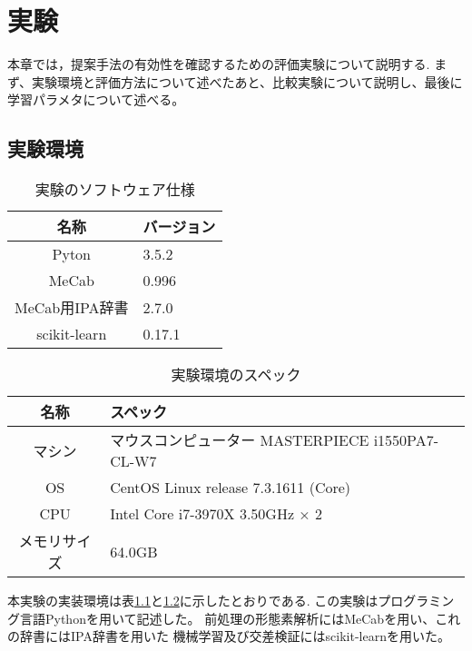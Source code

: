 \chapter{実験}
本章では，提案手法の有効性を確認するための評価実験について説明する.
まず、実験環境と評価方法について述べたあと、比較実験について説明し、最後に学習パラメタについて述べる。

\section{実験環境}
\begin{table}[ht]
  \begin{center}
  \caption{実験のソフトウェア仕様}
  \label{ex-software}
  \begin{tabular}{|c|l|}
    \hline
    名称 & バージョン \\ \hline \hline
    Pyton & 3.5.2 \\ \hline
    MeCab &  0.996 \\ \hline
    MeCab用IPA辞書 & 2.7.0 \\ \hline
    scikit-learn & 0.17.1 \\ \hline
  \end{tabular}
  \end{center}
\end{table}


\begin{table}[ht]
  \begin{center}
  \caption{実験環境のスペック}
  \label{ex-spec}
  \begin{tabular}{|c|l|}
    \hline
     名称 & スペック \\ \hline \hline
    マシン &  マウスコンピューター MASTERPIECE i1550PA7-CL-W7\\ \hline
    OS &  CentOS Linux release 7.3.1611 (Core)\\ \hline
    CPU & Intel Core i7-3970X 3.50GHz × 2 \\ \hline
    メモリサイズ & 64.0GB \\ \hline
  \end{tabular}
  \end{center}
\end{table}

本実験の実装環境は表\ref{ex-software}と\ref{ex-spec}に示したとおりである.
この実験はプログラミング言語Python\cite{python}を用いて記述した。
前処理の形態素解析にはMeCab\cite{mecab}を用い、これの辞書にはIPA辞書を用いた
機械学習及び交差検証にはscikit-learn\cite{sklearn}を用いた。

